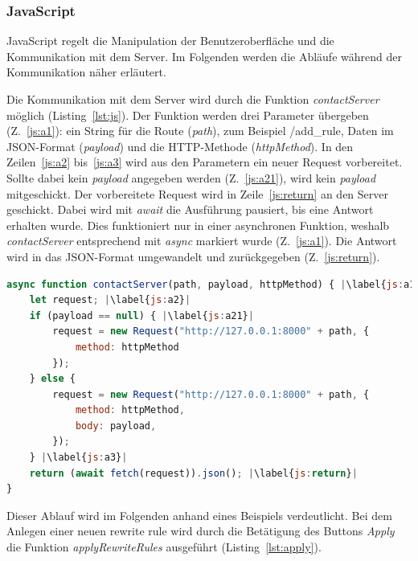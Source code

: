 \subsubsection{JavaScript}

JavaScript regelt die Manipulation der Benutzeroberfläche und die Kommunikation mit dem Server. Im Folgenden werden die Abläufe während der Kommunikation näher erläutert.

Die Kommunikation mit dem Server wird durch die Funktion \textit{contactServer} möglich (Listing~\ref{lst:js}).
Der Funktion werden drei Parameter übergeben (Z.~\ref{js:a1}): ein String für die Route (\textit{path}), zum Beispiel /add\_rule, Daten im JSON-Format (\textit{payload})
und die HTTP-Methode (\textit{httpMethod}). In den Zeilen~\ref{js:a2} bis~\ref{js:a3} wird aus den Parametern ein neuer Request vorbereitet. Sollte dabei kein \textit{payload}
angegeben werden (Z.~\ref{js:a21}), wird kein \textit{payload} mitgeschickt. Der vorbereitete Request wird in Zeile~\ref{js:return} an den Server geschickt. Dabei wird mit \textit{await}
die Ausführung pausiert, bis eine Antwort erhalten wurde. Dies funktioniert nur in einer asynchronen Funktion, weshalb \textit{contactServer} entsprechend mit \textit{async} 
markiert wurde (Z.~\ref{js:a1}). Die Antwort wird in das JSON-Format umgewandelt und zurückgegeben (Z.~\ref{js:return}).

\begin{lstlisting}[language=JavaScript, escapechar=|, caption=Auszug aus der Datei \textit{index.js}, label={lst:js}]
async function contactServer(path, payload, httpMethod) { |\label{js:a1}|
    let request; |\label{js:a2}|
    if (payload == null) { |\label{js:a21}|
        request = new Request("http://127.0.0.1:8000" + path, {
            method: httpMethod
        });
    } else {
        request = new Request("http://127.0.0.1:8000" + path, {
            method: httpMethod,
            body: payload,
        });
    } |\label{js:a3}|
    return (await fetch(request)).json(); |\label{js:return}|
}
\end{lstlisting} 

Dieser Ablauf wird im Folgenden anhand eines Beispiels verdeutlicht.
Bei dem Anlegen einer neuen rewrite rule wird durch die Betätigung des Buttons \textit{Apply} die Funktion \textit{applyRewriteRules} ausgeführt (Listing~\ref{lst:apply}).

